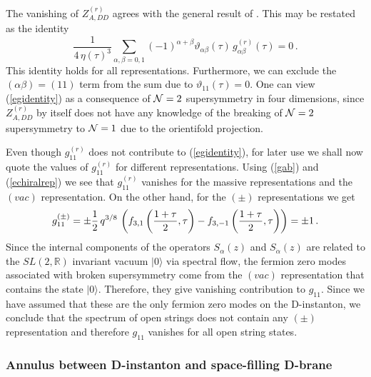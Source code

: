 \documentclass[12pt,a4paper]{article}
\newcommand{\be}{\begin{equation}}
\newcommand{\ee}{\end{equation}}
\newcommand{\refb}[1]{(\ref{#1})}
\newcommand{\IR}{\mathds{R}}
\def\({\left(}
\def\){\right)}
\newcommand{\vt}{\vartheta}
\newcommand{\NN}{{\cal N}}
\newcommand{\dalpha}{\beta}
\def\gr{g^{(r)}}
\def\gi#1{g^{(#1)}}
\def\Zr{Z^{(r)}}
\def\dalpha{{\dot\alpha}}
\begin{document}
The vanishing of $\Zr_{A,DD}$ agrees with the general result of \cite{Eguchi:1988vra}.
This may be restated as the identity
\be \label{egidentity}
\frac{1}{4\, \eta(\tau)^3}\sum_{\alpha,\beta=0,1} (-1)^{\alpha+\beta}
\vt_{\alpha\beta}(\tau) \, \gr_{\alpha\beta}(\tau)=0\, .
\ee
This identity holds for all representations. Furthermore, we can exclude the $(\alpha\beta)=(11)$
term from the sum due to $\vt_{11}(\tau)=0$. One can view \refb{egidentity} as a consequence
of $\NN=2$ supersymmetry in four dimensions, since $\Zr_{A,DD}$ by itself does not have
any knowledge of the breaking of $\NN=2$ supersymmetry to $\NN=1$ due to the
orientifold projection.

Even though $\gr_{11}$ does not contribute to \refb{egidentity}, for later
use we shall now quote the values of $\gr_{11}$ for different representations.
Using \refb{gab} and \refb{echiralrep} we see that $\gr_{11}$ vanishes for the massive representations
and the $(vac)$ representation. On the other hand, for the $(\pm)$ representations we get
\be \label{eg11pm}
\gi{\pm}_{11} = \pm {1\over 2}\, q^{3/8}\, \( f_{3,1} \({1+\tau\over 2},\tau\)- f_{3,-1} \({1+\tau\over 2},\tau\)\)
=\pm 1\, .
\ee
Since the internal components of the operators
$S_\alpha(z)$ and $S_\dalpha(z)$ are related to the $SL(2,\IR)$
invariant vacuum $|0\rangle$ via spectral flow, the fermion zero modes
associated with broken supersymmetry come from the $(vac)$ representation that contains
the state $|0\rangle$. Therefore, they give vanishing contribution to $g_{11}$. Since we have
assumed that these are the only fermion zero modes on the D-instanton, we conclude that the
spectrum of open strings does not contain any $(\pm)$ representation and therefore $g_{11}$
vanishes for all open string states.


\subsubsection{Annulus between D-instanton and space-filling D-brane}
\label{sE.3}
\end{document}
